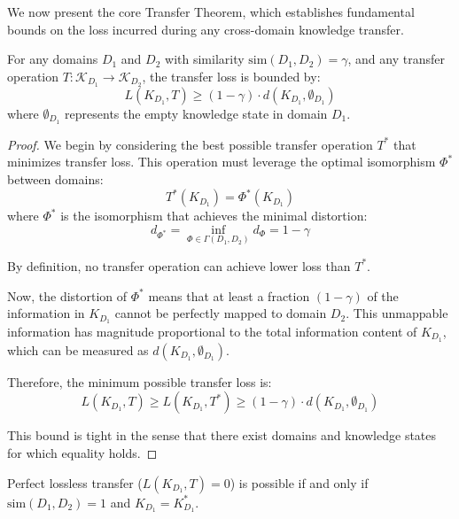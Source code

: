 We now present the core Transfer Theorem, which establishes fundamental bounds on the loss incurred during any cross-domain knowledge transfer.

\begin{theorem}
For any domains $D_1$ and $D_2$ with similarity $\text{sim}(D_1, D_2) = \gamma$, and any transfer operation $T: \mathcal{K}_{D_1} \to \mathcal{K}_{D_2}$, the transfer loss is bounded by:
\begin{equation}
L(K_{D_1}, T) \geq (1 - \gamma) \cdot d(K_{D_1}, \emptyset_{D_1})
\end{equation}
where $\emptyset_{D_1}$ represents the empty knowledge state in domain $D_1$.
\end{theorem}

\begin{proof}
We begin by considering the best possible transfer operation $T^*$ that minimizes transfer loss. This operation must leverage the optimal isomorphism $\Phi^*$ between domains:
\begin{equation}
T^*(K_{D_1}) = \Phi^*(K_{D_1})
\end{equation}
where $\Phi^*$ is the isomorphism that achieves the minimal distortion:
\begin{equation}
d_{\Phi^*} = \inf_{\Phi \in \Gamma(D_1, D_2)} d_{\Phi} = 1 - \gamma
\end{equation}

By definition, no transfer operation can achieve lower loss than $T^*$.

Now, the distortion of $\Phi^*$ means that at least a fraction $(1 - \gamma)$ of the information in $K_{D_1}$ cannot be perfectly mapped to domain $D_2$. This unmappable information has magnitude proportional to the total information content of $K_{D_1}$, which can be measured as $d(K_{D_1}, \emptyset_{D_1})$.

Therefore, the minimum possible transfer loss is:
\begin{equation}
L(K_{D_1}, T) \geq L(K_{D_1}, T^*) \geq (1 - \gamma) \cdot d(K_{D_1}, \emptyset_{D_1})
\end{equation}

This bound is tight in the sense that there exist domains and knowledge states for which equality holds.
\end{proof}

\begin{corollary}
Perfect lossless transfer ($L(K_{D_1}, T) = 0$) is possible if and only if $\text{sim}(D_1, D_2) = 1$ and $K_{D_1} = K_{D_1}^*$.
\end{corollary}

